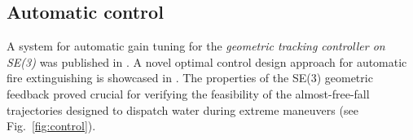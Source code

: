\documentclass[a4paper,11pt,titlepage,twoside]{book}
\newcommand{\reffig}[1]{Fig.~\ref{#1}}
\begin{document}
  \subsection{Automatic control}

  A system for automatic gain tuning for the \emph{geometric tracking controller on SE(3)} was published in \cite{giernacky2019realtime}.
  A novel optimal control design approach for automatic fire extinguishing is showcased in \cite{saikin2020wildfire}.
  The properties of the SE(3) geometric feedback proved crucial for verifying the feasibility of the almost-free-fall trajectories designed to dispatch water during extreme maneuvers (see \reffig{fig:control}).

  \begin{figure}
    \centering
    \hfill%
\end{figure}
\end{document}
